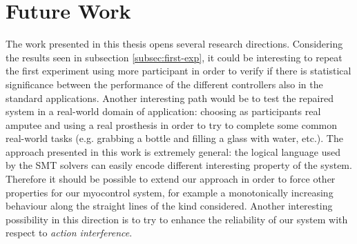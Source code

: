 \section{Future Work}\label{sec:future}
The work presented in this thesis opens several research directions. Considering the results seen in subsection \ref{subsec:first-exp}, it could be interesting to repeat the first experiment using more participant in order to verify if there is statistical significance between the performance of the different controllers also in the standard applications. Another interesting path would be to test the repaired system in a real-world domain of application: choosing as participants real amputee and using a real prosthesis in order to try to complete some common real-world tasks (e.g. grabbing a bottle and filling a glass with water, etc.). The approach presented in this work is extremely general: the logical language used by the SMT solvers can easily encode different interesting property of the system. Therefore it should be possible to extend our approach in order to force other properties for our myocontrol system, for example a monotonically increasing behaviour along the straight lines of the kind considered. Another interesting possibility in this direction is to try to enhance the reliability of our system with respect to \textit{action interference}.